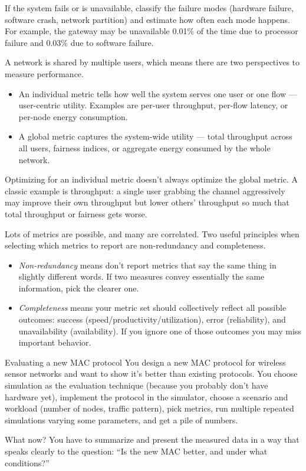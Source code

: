 If the system fails or is unavailable, classify the failure modes (hardware failure, software crash, network partition) and estimate how often each mode happens. For example, the gateway may be unavailable 0.01\% of the time due to processor failure and 0.03\% due to software failure.

A network is shared by multiple users, which means there are two perspectives to measure performance.
\begin{itemize}
    \item An individual metric tells how well the system serves one user or one flow — user-centric utility. Examples are per-user throughput, per-flow latency, or per-node energy consumption.
    \item A global metric captures the system-wide utility — total throughput across all users, fairness indices, or aggregate energy consumed by the whole network.
\end{itemize}
Optimizing for an individual metric doesn’t always optimize the global metric. A classic example is throughput: a single user grabbing the channel aggressively may improve their own throughput but lower others’ throughput so much that total throughput or fairness gets worse.

Lots of metrics are possible, and many are correlated. Two useful principles when selecting which metrics to report are non-redundancy and completeness.
\begin{itemize}
    \item \textit{Non-redundancy} means don’t report metrics that say the same thing in slightly different words. If two measures convey essentially the same information, pick the clearer one.
    \item \textit{Completeness} means your metric set should collectively reflect all possible outcomes: success (speed/productivity/utilization), error (reliability), and unavailability (availability). If you ignore one of those outcomes you may miss important behavior.
\end{itemize}

\begin{Example}{Evaluating a new MAC protocol}{}
    You design a new MAC protocol for wireless sensor networks and want to show it’s better than existing protocols. You choose simulation as the evaluation technique (because you probably don’t have hardware yet), implement the protocol in the simulator, choose a scenario and workload (number of nodes, traffic pattern), pick metrics, run multiple repeated simulations varying some parameters, and get a pile of numbers.

    What now? You have to summarize and present the measured data in a way that speaks clearly to the question: “Is the new MAC better, and under what conditions?”
\end{Example}


